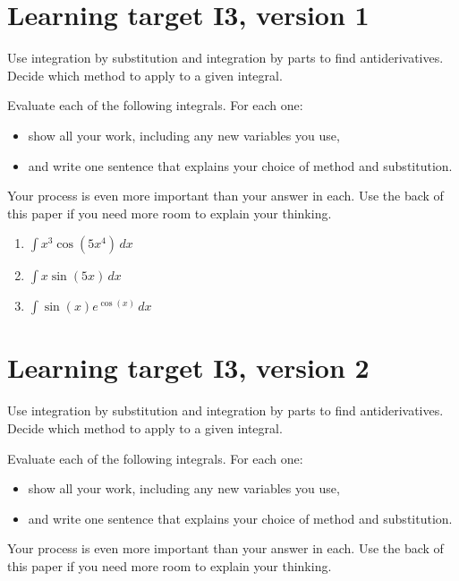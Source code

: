 




\everymath{\displaystyle}

\section{Learning target I3, version 1}

Use integration by substitution and integration by parts to find antiderivatives. Decide which method to apply to a given integral.

\hrulefill

Evaluate each of the following integrals. For each one:
\begin{itemize}
	\item show all your work, including any new variables you use,
	\item and write one sentence that explains your choice of method and substitution.
\end{itemize}
Your process is even more important than your answer in each. Use the back of this paper if you need more room to explain your thinking.

\begin{enumerate}
	\item $\int x^3 \cos(5x^4) \, dx$
	\vfill
	\item $\int x \sin(5x) \, dx$
	\vfill
	\item $\int \sin(x) e^{\cos(x)} \, dx$
	\vfill
\end{enumerate}
\pagebreak
\section{Learning target I3, version 2}

Use integration by substitution and integration by parts to find antiderivatives. Decide which method to apply to a given integral.

\hrulefill

Evaluate each of the following integrals. For each one:
\begin{itemize}
	\item show all your work, including any new variables you use,
	\item and write one sentence that explains your choice of method and substitution.
\end{itemize}
Your process is even more important than your answer in each. Use the back of this paper if you need more room to explain your thinking.

